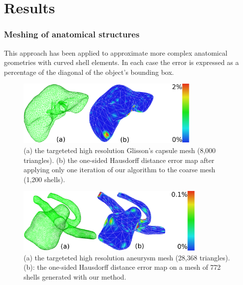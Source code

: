 \documentclass{llncs}
\begin{document}
\section{Results}
\label{sec:results}

\subsubsection{Meshing of anatomical structures}
%
This approach has been applied to approximate more complex anatomical geometries with curved shell elements. In each case the error is expressed as a percentage of the diagonal of the object's bounding box. 
\begin{figure}[h]
\centering
\includegraphics[height=3.2cm]{images/resultsLiver}
\caption {(a) the targeteted high resolution Glisson's capsule mesh (8,000 triangles). (b) the one-sided Hausdorff distance error map after applying only one iteration of our algorithm to the coarse mesh (1,200 shells).} 
\label{fig-liver}
\vspace{-0.5cm}
\end{figure}
%
\begin{figure}[h]
\centering
\includegraphics[height=3.2cm]{images/resultsAneurysm}
\caption {(a) the targeteted high resolution aneurysm mesh (28,368 triangles). (b): the one-sided Hausdorff distance error map on a mesh of 772 shells generated with our method.}
\label{fig-aneurysm}
\end{figure}
%
\end{document}
